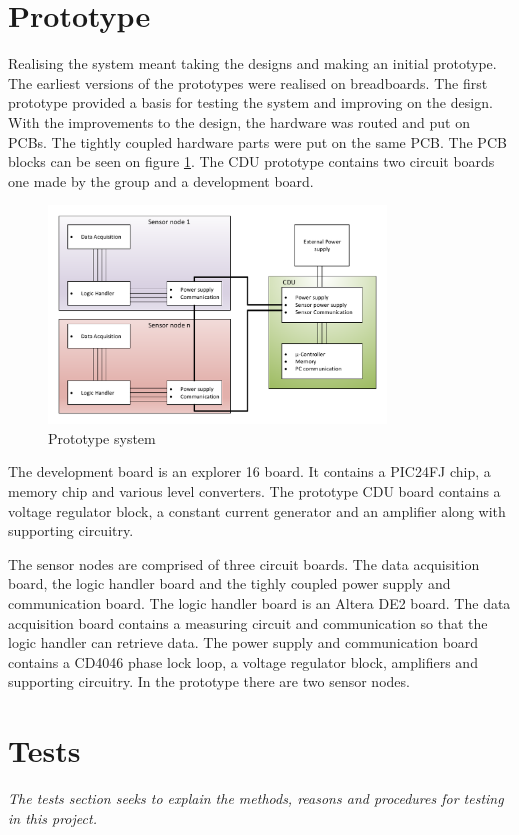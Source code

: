 \section{Prototype}
Realising the system meant taking the designs and making an initial prototype. The earliest versions of the prototypes were realised on breadboards. The first prototype provided a basis for testing the system and improving on the design. With the improvements to the design, the hardware was routed and put on PCBs. The tightly coupled hardware parts were put on the same PCB. The PCB blocks can be seen on figure \ref{fig:prototype}. The CDU prototype contains two circuit boards one made by the group and a development board. 
\begin{figure}[htbp]
	\centering
	\includegraphics[width=0.8\textwidth]{billeder/11ProjectDescription/prototypesystem}
	\caption{Prototype system}
	\label{fig:prototype}
\end{figure}
The development board is an explorer 16 board. It contains a PIC24FJ chip, a memory chip and various level converters. The prototype CDU board contains a voltage regulator block, a constant current generator and an amplifier along with supporting circuitry.

The sensor nodes are comprised of three circuit boards. The data acquisition board, the logic handler board and the tighly coupled power supply and communication board. The logic handler board is an Altera DE2 board. The data acquisition board contains a measuring circuit and communication so that the logic handler can retrieve data. The power supply and communication board contains a CD4046 phase lock loop, a voltage regulator block, amplifiers and supporting circuitry. In the prototype there are two sensor nodes.

\section{Tests}
\textit{The tests section seeks to explain the methods, reasons and procedures for testing in this project.}

